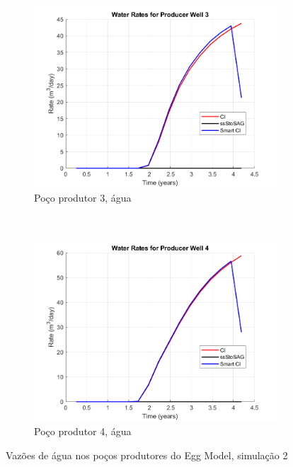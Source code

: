 \begin{figure}[!ht]
	\begin{subfigure}[b]{.3\textwidth}
		\includegraphics[width=\textwidth]{figs/resultadosEgg/imgsim2/EGG_WaterWell3_Zoom}
		\caption{Po\c{c}o produtor 3, \'{a}gua}
		\label{EGG2_WaterWell3}
	\end{subfigure}
	~
	\begin{subfigure}[b]{.3\textwidth}
		\includegraphics[width=\textwidth]{figs/resultadosEgg/imgsim2/EGG_WaterWell4_Zoom}
		\caption{Po\c{c}o produtor 4, \'{a}gua}
		\label{EGG2_WaterWell4}
	\end{subfigure}
	\caption{Vaz\~{o}es de \'{a}gua nos po\c{c}os produtores do Egg Model, simula\c{c}\~{a}o 2}
	\label{EGG2_WaterRates}
\end{figure}

